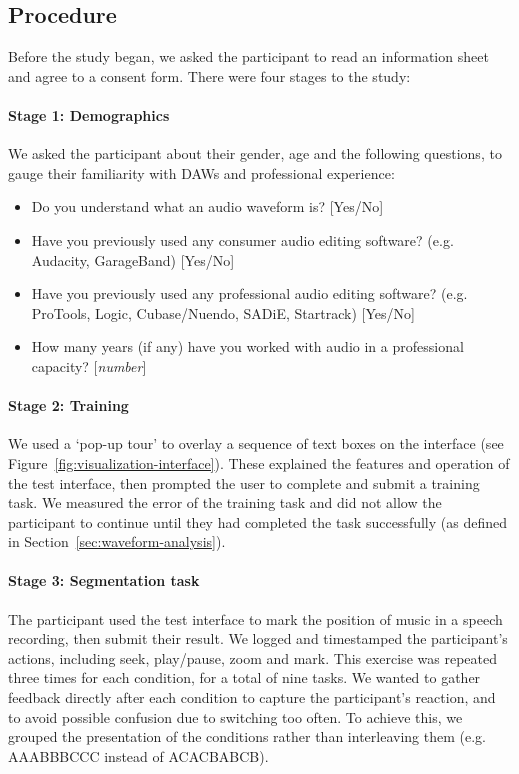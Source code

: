 \subsection{Procedure}
Before the study began, we asked the participant to read an information sheet and agree to a consent form. There were
four stages to the study:

\paragraph{Stage 1: Demographics}
We asked the participant about their gender, age and the following questions, to gauge their familiarity with DAWs and
professional experience:

{\singlespacing
\begin{itemize}
  \item Do you understand what an audio waveform is? [Yes/No]
  \item Have you previously used any consumer audio editing software? (e.g.  Audacity, GarageBand) [Yes/No]
  \item Have you previously used any professional audio editing software? (e.g.  ProTools, Logic, Cubase/Nuendo, SADiE,
    Startrack) [Yes/No]
  \item How many years (if any) have you worked with audio in a professional capacity? [\textit{number}]
\end{itemize}
}

\paragraph{Stage 2: Training}
We used a `pop-up tour' to overlay a sequence of text boxes on the interface (see
Figure~\ref{fig:visualization-interface}). These explained the features and operation of the test interface, then
prompted the user to complete and submit a training task. We measured the error of the training task and did not allow
the participant to continue until they had completed the task successfully (as defined in
Section~\ref{sec:waveform-analysis}).

\paragraph{Stage 3: Segmentation task}
The participant used the test interface to mark the position of music in a speech recording, then submit their result.
We logged and timestamped the participant's actions, including seek, play/pause, zoom and mark.  This exercise was
repeated three times for each condition, for a total of nine tasks.  We wanted to gather feedback directly after each
condition to capture the participant's reaction, and to avoid possible confusion due to switching too often.  To
achieve this, we grouped the presentation of the conditions rather than interleaving them (e.g. AAABBBCCC instead of
ACACBABCB).

